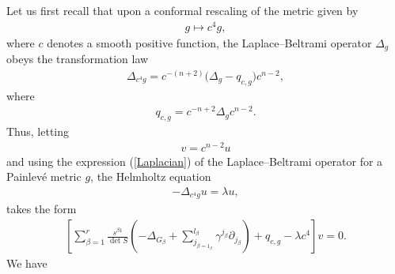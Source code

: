\documentclass[pdftex]{sigma}
\numberwithin{equation}{section}
\begin{document}
Let us first recall that upon a conformal rescaling of the metric given by
\begin{gather}\label{confresc}
g\mapsto c^{4}g,
\end{gather}
where $c$ denotes a smooth positive function, the Laplace--Beltrami operator $\Delta_{g}$ obeys the transformation law
\begin{gather}\label{Yamabe1}
\Delta_{c^{4}g}=c^{-(n+2)}\big(\Delta_{g}-q_{c,g}\big)c^{n-2},
\end{gather}
where
\begin{gather}\label{Yamabe2}
q_{c,g}=c^{-n+2}\Delta_{g}c^{n-2}.
\end{gather}
Thus, letting
\begin{gather}\label{rescaledu}
v=c^{n-2}u
\end{gather}
and using the expression (\ref{Laplacian}) of the Laplace--Beltrami operator for a Painlev\'e metric $g$, the Helmholtz equation
\begin{gather}\label{confHelmholtz}
-\Delta_{c^{4}g}u=\lambda u,
\end{gather}
takes the form
\begin{gather}\label{Yamabe3}
\left[\sum_{\beta=1}^{r}\frac{s^{\beta 1}}{\det S}\left(-\Delta_{G_{\beta}}+\sum_{j_{\beta=1_{\beta}}}^{l_{\beta}}\gamma^{j_{\beta}}\partial_{j_{\beta}}\right)+q_{c,g}-\lambda c^{4}\right]v=0.
\end{gather}
We have
\end{document}
